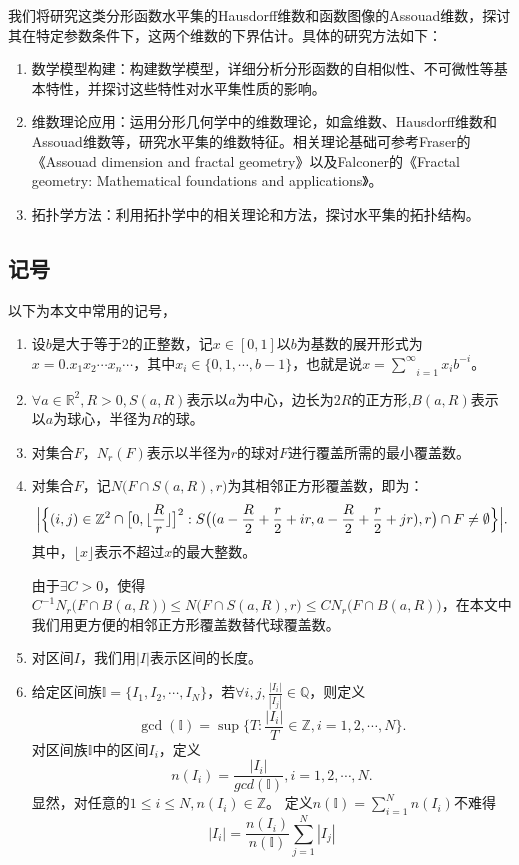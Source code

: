 我们将研究这类分形函数水平集的Hausdorff维数和函数图像的Assouad维数，探讨其在特定参数条件下，这两个维数的下界估计。具体的研究方法如下：

\begin{enumerate}
      \item 数学模型构建：构建数学模型，详细分析分形函数的自相似性、不可微性等基本特性，并探讨这些特性对水平集性质的影响。
      \item 维数理论应用：运用分形几何学中的维数理论，如盒维数、Hausdorff维数和Assouad维数等，研究水平集的维数特征。相关理论基础可参考Fraser的《Assouad dimension and fractal geometry》以及Falconer的《Fractal geometry: Mathematical foundations and applications》。
      \item 拓扑学方法：利用拓扑学中的相关理论和方法，探讨水平集的拓扑结构。
\end{enumerate}

\subsection{记号}
以下为本文中常用的记号，
\begin{enumerate}
      \item 设$b$是大于等于$2$的正整数，记$x\in[0,1]$以$b$为基数的展开形式为$x=0.x_1x_2\cdots x_n\cdots$，其中$x_i\in\{0,1,\cdots,b-1\}$，也就是说$x=\underset{i=1}{\overset{\infty}{\sum}}x_ib^{-i}$。
      \item $\forall a\in\mathbb{R}^2,R>0,S(a,R)$表示以$a$为中心，边长为$2R$的正方形,$B(a,R)$表示以$a$为球心，半径为$R$的球。
      \item 对集合$F$，$N_r(F)$表示以半径为$r$的球对$F$进行覆盖所需的最小覆盖数。
      \item 对集合$F$，记$N\big(F\cap S(a,R),r\big)$为其相邻正方形覆盖数，即为：
      $$
      \Big|\Big\{(i,j)\in\mathbb{Z}^2\cap\big[0,\lfloor\frac{R}{r}\rfloor\big]^2:\\
      S\big((a-\frac{R}{2}+\frac{r}{2}+ir,a-\frac{R}{2}+\frac{r}{2}+jr),r\big)\cap F\neq\emptyset\Big\}\Big|.
      $$
      其中，$\lfloor x \rfloor$表示不超过$x$的最大整数。

      由于$\exists C>0$，使得$C^{-1}N_r\big(F\cap B(a,R)\big)\le N\big(F\cap S(a,R),r\big)\le CN_r\big(F\cap B(a,R)\big)$，在本文中我们用更方便的相邻正方形覆盖数替代球覆盖数。

      \item 对区间$I$，我们用$|I|$表示区间的长度。
      \item 给定区间族$\mathbb{I}=\{I_1,I_2,\cdots,I_N\}$，若$\forall i,j,\frac{|I_i|}{|I_j|}\in\mathbb{Q}$，则定义
      $$
      \gcd(\mathbb{I})=\sup\big\{T:\frac{|I_i|}{T}\in\mathbb{Z},i=1,2,\cdots,N\big\}.
      $$
      对区间族$\mathbb{I}$中的区间$I_i$，定义
      $$
      n(I_i)=\frac{|I_i|}{gcd(\mathbb{I})},i=1,2,\cdots,N.
      $$
      显然，对任意的$1\le i\le N,n(I_i)\in\mathbb{Z}$。
      定义$n(\mathbb{I})=\sum_{i=1}^Nn(I_i)$不难得
      $$|I_i|=\frac{n(I_i)}{n(\mathbb{I})}\sum_{j=1}^N|I_j|$$

\end{enumerate}

